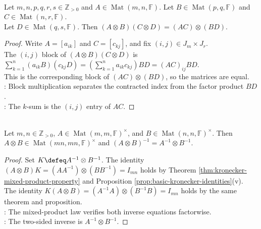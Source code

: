 \begin{theorem} \label{thm:kronecker-mixed-product-property} \\
Let $m,n,p,q,r,s\in\mathbb{Z}_{>0}$ and $A\in\operatorname{Mat}(m,n,\mathbb{F})$. Let $B\in\operatorname{Mat}(p,q,\mathbb{F})$ and $C\in\operatorname{Mat}(n,r,\mathbb{F})$.\\
Let $D\in\operatorname{Mat}(q,s,\mathbb{F})$. Then $(A\otimes B)(C\otimes D)=(AC)\otimes(BD)$.
\begin{proof}
Write $A=[a_{ik}]$ and $C=[c_{kj}]$, and fix $(i,j)\in J_m\times J_r$.\\
The $(i,j)$ block of $(A\otimes B)(C\otimes D)$ is $\sum\limits_{k=1}^{n}(a_{ik}B)(c_{kj}D)=\left(\sum\limits_{k=1}^{n}a_{ik}c_{kj}\right)BD=(AC)_{ij}BD$.\\
This is the corresponding block of $(AC)\otimes(BD)$, so the matrices are equal.\\
: Block multiplication separates the contracted index from the factor product $BD$.\\
: The $k$-sum is the $(i,j)$ entry of $AC$.
\end{proof}
\end{theorem}

\begin{corollary} \label{cor:inverse-of-kronecker-product} \\
Let $m,n\in\mathbb{Z}_{>0}$, $A\in\operatorname{Mat}(m,m,\mathbb{F})^\times$, and $B\in\operatorname{Mat}(n,n,\mathbb{F})^\times$. Then $A\otimes B\in\operatorname{Mat}(mn,mn,\mathbb{F})^\times$ and $(A\otimes B)^{-1}=A^{-1}\otimes B^{-1}$.
\begin{proof}
Set $K\defeq A^{-1}\otimes B^{-1}$. The identity $(A\otimes B)K=(AA^{-1})\otimes(BB^{-1})=I_{mn}$ holds by Theorem \ref{thm:kronecker-mixed-product-property} and Proposition \ref{prop:basic-kronecker-identities}(v).\\
The identity $K(A\otimes B)=(A^{-1}A)\otimes(B^{-1}B)=I_{mn}$ holds by the same theorem and proposition.\\
: The mixed-product law verifies both inverse equations factorwise.\\
: The two-sided inverse is $A^{-1}\otimes B^{-1}$.
\end{proof}
\end{corollary}

